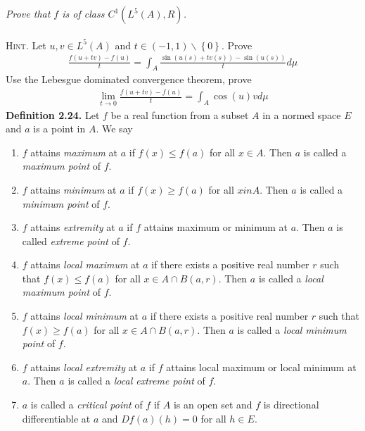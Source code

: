 \documentclass[a4paper]{article}
\numberwithin{equation}{section}
\begin{document}
\textit{Prove that $f$ is of class ${C^1}\left( {{L^5}\left( A \right),R} \right)$.}\\
\\
\textsc{Hint.} Let $u,v\in L^5\left(A\right)$ and $t \in \left( { - 1,1} \right)\backslash \left\{ 0 \right\}$. Prove \begin{align}
\frac{{f\left( {u + tv} \right) - f\left( u \right)}}{t} = \int_A {\frac{{\sin \left( {u\left( s \right) + tv\left( s \right)} \right) - \sin \left( {u\left( s \right)} \right)}}{t}d\mu } 
\end{align}
Use the Lebesgue dominated convergence theorem, prove
\begin{align}
\mathop {\lim }\limits_{t \to 0} \frac{{f\left( {u + tv} \right) - f\left( u \right)}}{t} = \int_A {\cos \left( u \right)vd\mu } 
\end{align}
\textbf{Definition 2.24.} Let $f$ be a real function from a subset $A$ in a normed space $E$ and $a$ is a point in $A$. We say
\begin{enumerate}
\item $f$ attains \textit{maximum} at $a$ if $f\left(x\right)\le f\left(a\right)$ for all $x \in A$. Then $a$ is called a \textit{maximum point} of $f$.
\item $f$ attains \textit{minimum} at $a$ if $f\left(x\right) \ge f\left(a\right)$ for all $x in A$. Then $a$ is called a \textit{minimum point} of $f$.
\item $f$ attains \textit{extremity} at $a$ if $f$ attains maximum or minimum at $a$. Then $a$ is called \textit{extreme point} of $f$.
\item $f$ attains \textit{local maximum} at $a$ if there exists a positive real number $r$ such that $f\left(x\right)\le f\left(a\right)$ for all $x \in A \cap B\left( {a,r} \right)$. Then $a$ is called a \textit{local maximum point} of $f$.
\item $f$ attains \textit{local minimum} at $a$ if there exists a positive real number $r$ such that $f\left(x\right)\ge f\left(a\right)$ for all $x \in A \cap B\left( {a,r} \right)$. Then $a$ is called a \textit{local minimum point} of $f$.
\item $f$ attains \textit{local extremity} at $a$ if $f$ attains local maximum or local minimum at $a$. Then $a$ is called a \textit{local extreme point} of $f$.
\item $a$ is called a \textit{critical point} of $f$ if $A$ is an open set and $f$ is directional differentiable at $a$ and $Df\left(a\right)\left(h\right)=0$ for all $h\in E$.
\end{enumerate}
\end{document}
